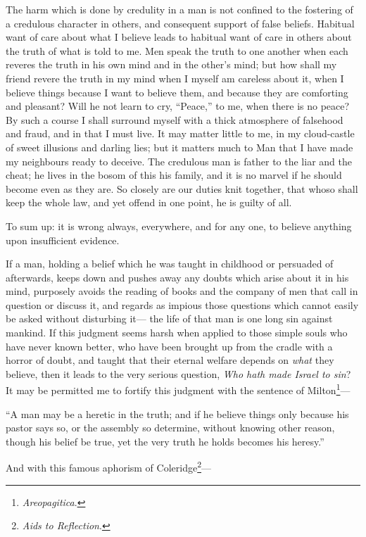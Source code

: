 \documentclass[12pt]{article}
\begin{document}
The harm which is done by credulity in a man is not confined to the fostering of a credulous character in others, and consequent support of false beliefs. Habitual want of care about what I believe leads to habitual want of care in others about the truth of what is told to me. Men speak the truth to one another when each reveres the truth in his own mind and in the other's mind; but how shall my friend revere the truth in my mind when I myself am careless about it, when I believe things because I want to believe them, and because they are comforting and pleasant? Will he not learn to cry, ``Peace,'' to me, when there is no peace? By such a course I shall surround myself with a thick atmosphere of falsehood and fraud, and in that I must live. It may matter little to me, in my cloud-castle of sweet illusions and darling lies; but it matters much to Man that I have made my neighbours ready to deceive. The credulous man is father to the liar and the cheat; he lives in the bosom of this his family, and it is no marvel if he should become even as they are. So closely are our duties knit together, that whoso shall keep the whole law, and yet offend in one point, he is guilty of all.

To sum up: it is wrong always, everywhere, and for any one, to believe anything upon insufficient evidence.

If a man, holding a belief which he was taught in childhood or persuaded of afterwards, keeps down and pushes away any doubts which arise about it in his mind, purposely avoids the reading of books and the company of men that call in question or discuss it, and regards as impious those questions which cannot easily be asked without disturbing it--- the life of that man is one long sin against mankind. If this judgment seems harsh when applied to those simple souls who have never known better, who have been brought up from the cradle with a horror of doubt, and taught that their eternal welfare depends on \emph{what} they believe, then it leads to the very serious question, \emph{Who hath made Israel to sin}? It may be permitted me to fortify this judgment with the sentence of Milton\footnote{\emph{Areopagitica}.}---

``A man may be a heretic in the truth; and if he believe things only because his pastor says so, or the assembly so determine, without knowing other reason, though his belief be true, yet the very truth he holds becomes his heresy.''

And with this famous aphorism of Coleridge\footnote{\emph{Aids to Reflection}.}---
\end{document}
